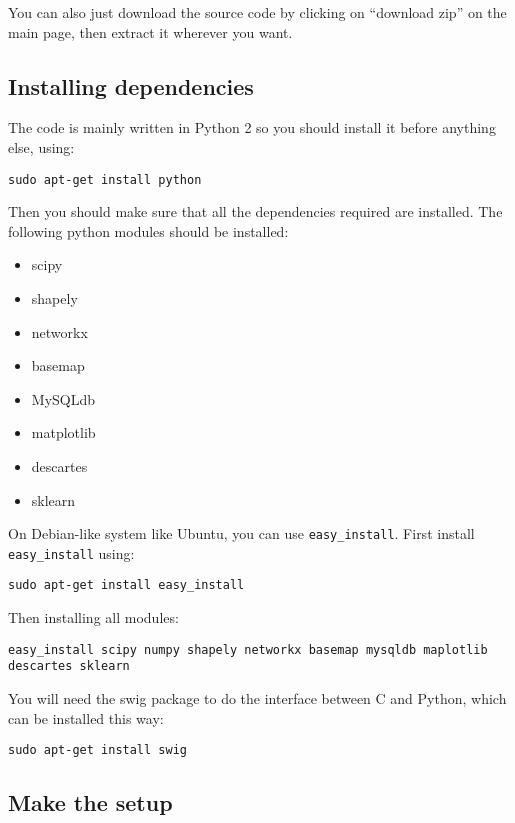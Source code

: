 \documentclass[12pt]{article}
\begin{document}
You can also just download the source code by clicking on ``download zip'' on the main page, then extract it wherever you want.

\subsection{Installing dependencies}

The code is mainly written in Python 2 so you should install it before anything else, using:

\begin{verbatim}
sudo apt-get install python
\end{verbatim}

Then you should make sure that all the dependencies required are installed. The following python modules should be installed:

\begin{itemize}
\item scipy
\item shapely
\item networkx
\item basemap
\item MySQLdb
\item matplotlib
\item descartes
\item sklearn
\end{itemize}

On Debian-like system like Ubuntu, you can use \verb|easy_install|. First install \verb|easy_install| using:

\begin{verbatim}
sudo apt-get install easy_install 
\end{verbatim}

Then installing all modules:

\begin{verbatim}
easy_install scipy numpy shapely networkx basemap mysqldb maplotlib descartes sklearn
\end{verbatim}

You will need the swig package to do the interface between C and Python, which can be installed this way:
\begin{verbatim}
sudo apt-get install swig
\end{verbatim}

\subsection{Make the setup}
\end{document}
